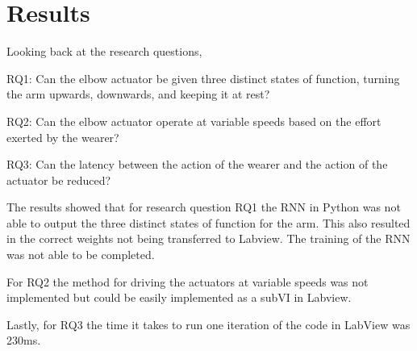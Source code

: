 \section{Results}
\label{section:results}

%
%
%
Looking back at the research questions,

RQ1: Can the elbow actuator be given three distinct states of function, turning the arm upwards, downwards, and keeping it at rest?

RQ2: Can the elbow actuator operate at variable speeds based on the effort exerted by the wearer?

RQ3: Can the latency between the action of the wearer and the action of the actuator be reduced?

The results showed that for research question RQ1 the RNN in Python was not able to output the three distinct states of function for the arm. This also resulted in the correct weights not being transferred to Labview. 
The training of the RNN was not able to be completed. 

For RQ2 the method for driving the actuators at variable speeds was not implemented but could be easily implemented as a subVI in Labview.  

Lastly, for RQ3 the time it takes to run one iteration of the code in LabView was 230ms.